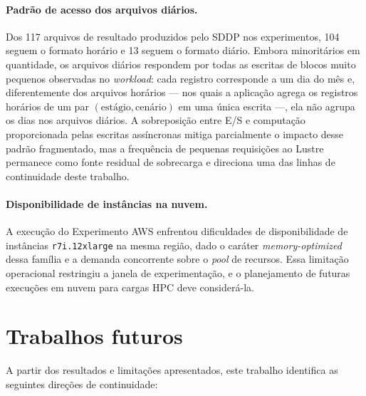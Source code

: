 \paragraph{Padrão de acesso dos arquivos diários.} Dos 117 arquivos
de resultado produzidos pelo SDDP nos experimentos, 104 seguem o
formato horário e 13 seguem o formato diário. Embora minoritários
em quantidade, os arquivos diários respondem por todas as escritas
de blocos muito pequenos observadas no \textit{workload}: cada
registro corresponde a um dia do mês e, diferentemente dos arquivos
horários --- nos quais a aplicação agrega os registros horários de um par
$(\text{estágio}, \text{cenário})$ em uma única escrita ---, ela não agrupa
os dias nos arquivos diários. A
sobreposição entre E/S e computação proporcionada pelas escritas
assíncronas mitiga parcialmente o impacto desse padrão fragmentado, mas a
frequência de pequenas requisições ao Lustre permanece como fonte residual
de sobrecarga e direciona uma das linhas de continuidade deste trabalho.

\paragraph{Disponibilidade de instâncias na nuvem.} A execução do
Experimento AWS enfrentou dificuldades de disponibilidade de
instâncias \texttt{r7i.12xlarge} na mesma região, dado o caráter
\textit{memory-optimized} dessa família e a demanda concorrente
sobre o \textit{pool} de recursos. Essa limitação operacional
restringiu a janela de experimentação, e o planejamento de futuras
execuções em nuvem para cargas HPC deve considerá-la.

\section*{Trabalhos futuros}

A partir dos resultados e limitações apresentados, este trabalho
identifica as seguintes direções de continuidade:

